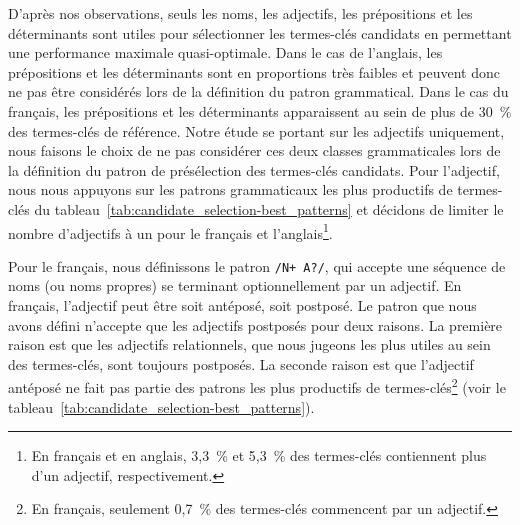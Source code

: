         D'après nos observations, seuls les noms, les adjectifs, les
        prépositions et les déterminants sont utiles pour sélectionner les
        termes-clés candidats en permettant une performance maximale
        quasi-optimale. Dans le cas de l'anglais, les prépositions et les
        déterminants sont en proportions très faibles et peuvent donc ne pas
        être considérés lors de la définition du patron grammatical. Dans le cas
        du français, les prépositions et les déterminants apparaissent au sein
        de plus de 30~\% des termes-clés de référence. Notre étude se portant
        sur les adjectifs uniquement, nous faisons le choix de ne pas considérer
        ces deux classes grammaticales lors de la définition du patron de
        présélection des termes-clés candidats. Pour l'adjectif, nous nous
        appuyons sur les patrons grammaticaux les plus productifs de termes-clés
        du tableau~\ref{tab:candidate_selection-best_patterns} et décidons de
        limiter le nombre d'adjectifs à un pour le français et
        l'anglais\footnote{En français et en anglais, 3,3~\% et 5,3~\% des
        termes-clés contiennent plus d'un adjectif, respectivement.}.
        
        Pour le français, nous définissons le patron \texttt{/N+ A?/}, qui
        accepte une séquence de noms (ou noms propres) se terminant
        optionnellement par un adjectif. En français, l'adjectif peut être soit
        antéposé, soit postposé. Le patron que nous avons défini n'accepte que
        les adjectifs postposés pour deux raisons. La première raison est que
        les adjectifs relationnels, que nous jugeons les
        plus utiles au sein des termes-clés, sont toujours postposés. La seconde
        raison est que l'adjectif antéposé ne fait pas partie des patrons les
        plus productifs de termes-clés\footnote{En français, seulement 0,7~\%
        des termes-clés commencent par un adjectif.} (voir le
        tableau~\ref{tab:candidate_selection-best_patterns}).
        
